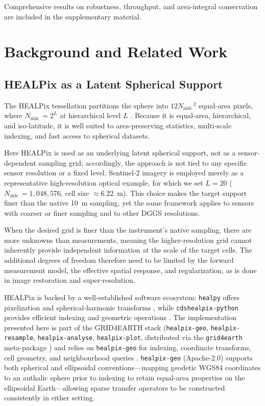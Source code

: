 \documentclass[journal]{IEEEtran}
\newcommand{\healpix}{HEALPix\xspace}
\newcommand{\Nside}{N_{\mathrm{side}}\,}
\begin{document}
Comprehensive results on robustness, throughput, and area-integral conservation are included in the supplementary material.

\section{Background and Related Work}

\subsection{HEALPix as a Latent Spherical Support}

The \healpix tessellation partitions the sphere into $12\Nside^2$ equal-area pixels, where $\Nside=2^L$ at hierarchical level $L$ \cite{gorski2005healpix,calabretta2007healpix}. Because it is equal-area, hierarchical, and iso-latitude, it is well suited to area-preserving statistics, multi-scale indexing, and fast access to spherical datasets.

Here \healpix is used as an underlying latent spherical support, not as a sensor-dependent sampling grid; accordingly, the approach is not tied to any specific sensor resolution or a fixed level. Sentinel-2 imagery is employed merely as a representative high-resolution optical example, for which we set $L=20$ ($\Nside=1{,}048{,}576$, cell size $\approx6.22$~m). This choice makes the target support finer than the native 10~m sampling, yet the same framework applies to sensors with coarser or finer sampling and to other DGGS resolutions.

When the desired grid is finer than the instrument’s native sampling, there are more unknowns than measurements, meaning the higher-resolution grid cannot inherently provide independent information at the scale of the target cells. The additional degrees of freedom therefore need to be limited by the forward measurement model, the effective spatial response, and regularization, as is done in image restoration and super-resolution.

\healpix is backed by a well-established software ecosystem: \texttt{healpy} offers pixelization and spherical-harmonic transforms \cite{zonca2019healpy}, while \texttt{cdshealpix-python} provides efficient indexing and geometric operations \cite{cdshealpix2021}. The implementation presented here is part of the GRID4EARTH stack (\texttt{healpix-geo}, \texttt{healpix-resample}, \texttt{healpix-analyse}, \texttt{healpix-plot}, distributed via the \texttt{grid4earth} meta-package \cite{grid4earth_tools}) and relies on \texttt{healpix-geo} for indexing, coordinate transforms, cell geometry, and neighbourhood queries \cite{healpix_geo_repo,healpix_resample_repo}. \texttt{healpix-geo} (Apache-2.0) supports both spherical and ellipsoidal conventions—mapping geodetic WGS84 coordinates to an authalic sphere prior to indexing to retain equal-area properties on the ellipsoidal Earth—allowing sparse transfer operators to be constructed consistently in either setting.
\end{document}
